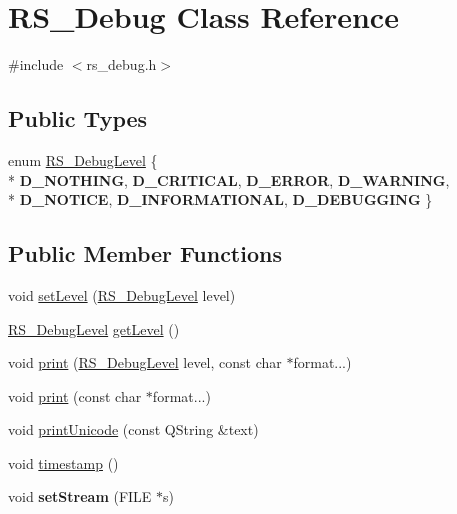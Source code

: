 \hypertarget{classRS__Debug}{\section{R\-S\-\_\-\-Debug Class Reference}
\label{classRS__Debug}
}


{\ttfamily \#include $<$rs\-\_\-debug.\-h$>$}

\subsection*{Public Types}
\begin{DoxyCompactItemize}
\item 
enum \hyperlink{classRS__Debug_af13c679a07ad1548ce7624cb9a38d347}{R\-S\-\_\-\-Debug\-Level} \{ \\*
{\bfseries D\-\_\-\-N\-O\-T\-H\-I\-N\-G}, 
{\bfseries D\-\_\-\-C\-R\-I\-T\-I\-C\-A\-L}, 
{\bfseries D\-\_\-\-E\-R\-R\-O\-R}, 
{\bfseries D\-\_\-\-W\-A\-R\-N\-I\-N\-G}, 
\\*
{\bfseries D\-\_\-\-N\-O\-T\-I\-C\-E}, 
{\bfseries D\-\_\-\-I\-N\-F\-O\-R\-M\-A\-T\-I\-O\-N\-A\-L}, 
{\bfseries D\-\_\-\-D\-E\-B\-U\-G\-G\-I\-N\-G}
 \}
\end{DoxyCompactItemize}
\subsection*{Public Member Functions}
\begin{DoxyCompactItemize}
\item 
void \hyperlink{classRS__Debug_a8d5d605324b74d682c9b16762602e298}{set\-Level} (\hyperlink{classRS__Debug_af13c679a07ad1548ce7624cb9a38d347}{R\-S\-\_\-\-Debug\-Level} level)
\item 
\hyperlink{classRS__Debug_af13c679a07ad1548ce7624cb9a38d347}{R\-S\-\_\-\-Debug\-Level} \hyperlink{classRS__Debug_ad1977719a820d5a391ffde470d44633a}{get\-Level} ()
\item 
void \hyperlink{classRS__Debug_a9d6aedf221a9c547e9014474c2da0642}{print} (\hyperlink{classRS__Debug_af13c679a07ad1548ce7624cb9a38d347}{R\-S\-\_\-\-Debug\-Level} level, const char $\ast$format...)
\item 
void \hyperlink{classRS__Debug_ab054d6d7d8788673617d271aeaf188e4}{print} (const char $\ast$format...)
\item 
void \hyperlink{classRS__Debug_a6cf56345a447281a41d27be4d1ae634c}{print\-Unicode} (const Q\-String \&text)
\item 
void \hyperlink{classRS__Debug_adfcd4dad164fdfa0c9c856d0d8750b51}{timestamp} ()
\item 
\hypertarget{classRS__Debug_a0fa3d650a561123e9df648861286c9cb}{void {\bfseries set\-Stream} (F\-I\-L\-E $\ast$s)}\label{classRS__Debug_a0fa3d650a561123e9df648861286c9cb}

\end{DoxyCompactItemize}
